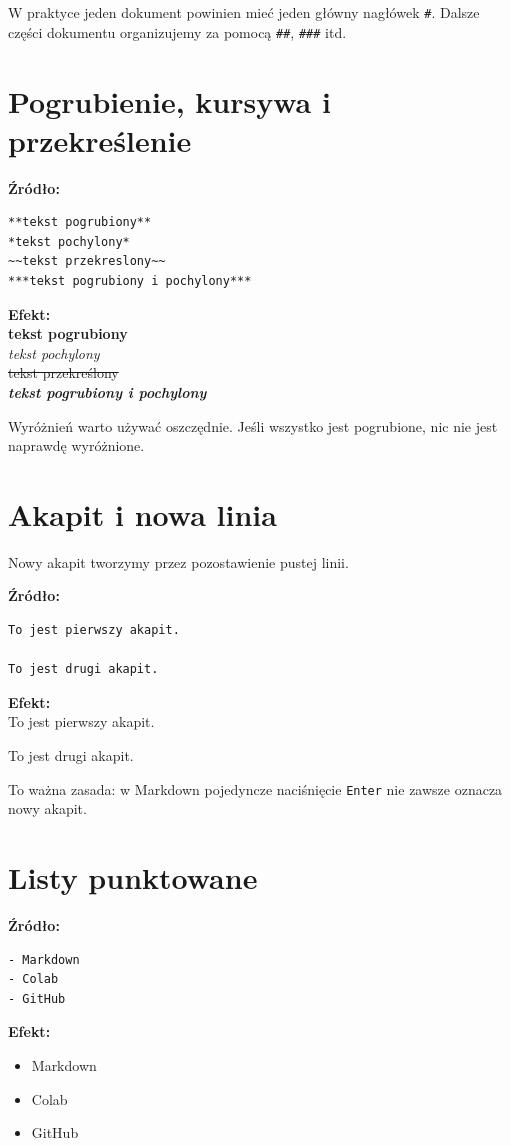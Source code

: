 \documentclass[12pt, a4paper]{article}
\begin{document}
W praktyce jeden dokument powinien mieć jeden główny nagłówek \texttt{\#}. Dalsze części dokumentu organizujemy za pomocą \texttt{\#\#}, \texttt{\#\#\#} itd.

\section{Pogrubienie, kursywa i przekreślenie}

\textbf{Źródło:}
\begin{lstlisting}
**tekst pogrubiony**
*tekst pochylony*
~~tekst przekreslony~~
***tekst pogrubiony i pochylony***
\end{lstlisting}

\textbf{Efekt:}\\
\textbf{tekst pogrubiony}\\
\textit{tekst pochylony}\\
\sout{tekst przekreślony}\\
\textbf{\textit{tekst pogrubiony i pochylony}}

Wyróżnień warto używać oszczędnie. Jeśli wszystko jest pogrubione, nic nie jest naprawdę wyróżnione.

\section{Akapit i nowa linia}
Nowy akapit tworzymy przez pozostawienie pustej linii.

\textbf{Źródło:}
\begin{lstlisting}
To jest pierwszy akapit.

To jest drugi akapit.
\end{lstlisting}

\textbf{Efekt:}\\
To jest pierwszy akapit.

To jest drugi akapit.

To ważna zasada: w Markdown pojedyncze naciśnięcie \texttt{Enter} nie zawsze oznacza nowy akapit.

\section{Listy punktowane}
\textbf{Źródło:}
\begin{lstlisting}
- Markdown
- Colab
- GitHub
\end{lstlisting}

\textbf{Efekt:}
\begin{itemize}
    \item Markdown
    \item Colab
    \item GitHub
\end{itemize}
\end{document}
